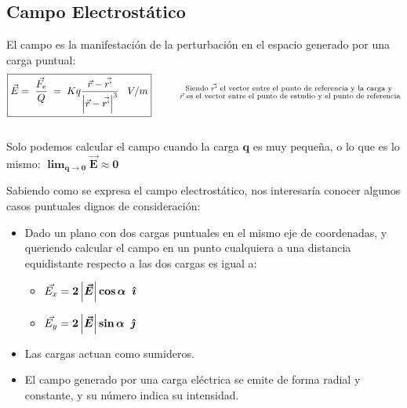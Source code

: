 \subsection{Campo Electrostático}
\noindent El campo es la manifestación de la perturbación en el espacio generado por una carga puntual:
\[
        \boxed{\vec{E} = \hspace{1mm}\frac{\vec{F_e}}{Q} \hspace{1mm}= \hspace{1mm} Kq\frac{\vec{r} -\vec{r`}}{\left | \vec{r} -\vec{r`} \right |^3} \hspace{3mm}V/m} \hspace{1cm}
        \substack{\textnormal{Siendo \(\vec{r`}\) el vector entre el punto de referencia y la carga y }
                \\
                \textnormal{\(\vec{r}\) es el vector entre el punto de estudio y el punto de referencia}
        }
\]
\\
Solo podemos calcular el campo cuando la carga \(\bm{q}\) es muy pequeña, o lo que es lo mismo: \(\bm{\lim_{q \to 0} \vec{E} \approx 0}\) \par
\vspace{0.5cm}
\noindent Sabiendo como se expresa el campo electrostático, nos interesaría conocer algunos casos puntuales dignos de consideración:
\begin{itemize}
        \item Dado un plano con dos cargas puntuales en el mismo eje de coordenadas, y queriendo calcular el campo en un punto cualquiera a una distancia equidistante respecto a las dos cargas es igual a:
              \begin{itemize}
                      \item \(\vec{E_x} = \bm{2\left | \vec{E} \right | \cos{\bm{\alpha}}}\hspace{2mm} \bm{\hat{\imath}}\)
                      \item \(\vec{E_y} = \bm{2\left | \vec{E} \right | \sin{\bm{\alpha}}} \hspace{2mm} \bm{\hat{\jmath}}\)
              \end{itemize}
        \item Las cargas actuan como sumideros.
        \item El campo generado por una carga eléctrica se emite de forma radial y constante, y su número indica su intensidad.
\end{itemize}
